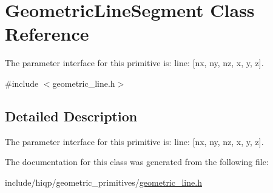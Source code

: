 \hypertarget{classGeometricLineSegment}{\section{Geometric\-Line\-Segment Class Reference}
\label{classGeometricLineSegment}
}


The parameter interface for this primitive is\-: line\-: \mbox{[}nx, ny, nz, x, y, z\mbox{]}.  




{\ttfamily \#include $<$geometric\-\_\-line.\-h$>$}



\subsection{Detailed Description}
The parameter interface for this primitive is\-: line\-: \mbox{[}nx, ny, nz, x, y, z\mbox{]}. 

The documentation for this class was generated from the following file\-:\begin{DoxyCompactItemize}
\item 
include/hiqp/geometric\-\_\-primitives/\hyperlink{geometric__line_8h}{geometric\-\_\-line.\-h}\end{DoxyCompactItemize}

